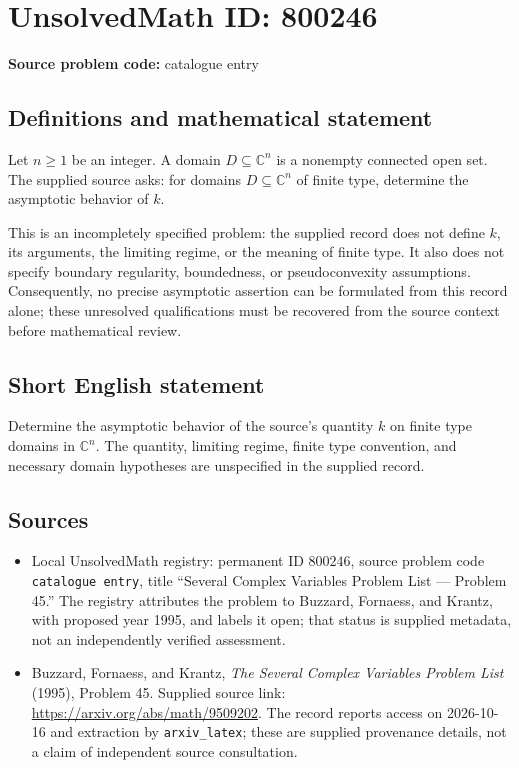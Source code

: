 \documentclass[11pt]{article}
\newcommand{\C}{\mathbb{C}}
\begin{document}
\section*{UnsolvedMath ID: 800246}
\textbf{Source problem code:} catalogue entry
\subsection{Definitions and mathematical statement}
Let \(n\geq 1\) be an integer. A domain \(D\subseteq\C^n\) is a nonempty connected open set. The supplied source asks: for domains \(D\subseteq\C^n\) of finite type, determine the asymptotic behavior of \(k\).

This is an incompletely specified problem: the supplied record does not define \(k\), its arguments, the limiting regime, or the meaning of finite type. It also does not specify boundary regularity, boundedness, or pseudoconvexity assumptions. Consequently, no precise asymptotic assertion can be formulated from this record alone; these unresolved qualifications must be recovered from the source context before mathematical review.
\subsection{Short English statement}
Determine the asymptotic behavior of the source's quantity \(k\) on finite type domains in \(\C^n\). The quantity, limiting regime, finite type convention, and necessary domain hypotheses are unspecified in the supplied record.
\subsection{Sources}
\begin{itemize}
\item Local UnsolvedMath registry: permanent ID \(800246\), source problem code \texttt{catalogue entry}, title ``Several Complex Variables Problem List --- Problem 45.'' The registry attributes the problem to Buzzard, Fornaess, and Krantz, with proposed year 1995, and labels it open; that status is supplied metadata, not an independently verified assessment.
\item Buzzard, Fornaess, and Krantz, \emph{The Several Complex Variables Problem List} (1995), Problem 45. Supplied source link: \url{https://arxiv.org/abs/math/9509202}. The record reports access on 2026-10-16 and extraction by \texttt{arxiv\_latex}; these are supplied provenance details, not a claim of independent source consultation.
\end{itemize}
\end{document}
